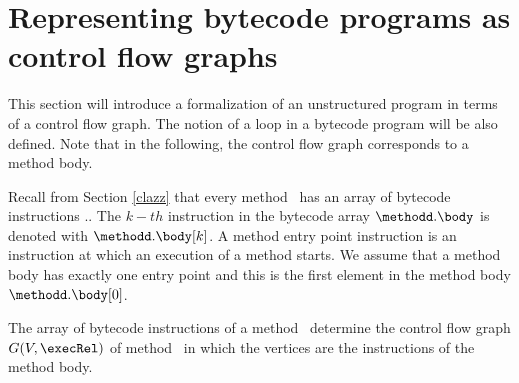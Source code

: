 \newtheorem{defEdge}{Definition}[section]
\newtheorem{defLoop}[defEdge]{Definition}
\newtheorem{defInter}[defEdge]{Definition}

\newtheorem{defInv}[defEdge]{Definition}
\newtheorem{defModif}[defEdge]{Definition}

\newtheorem{propPath}{Lemma}[section]

\section{Representing bytecode programs as control flow graphs}\label{prelim:ctrFlow}

This section will introduce a formalization of an unstructured program in terms of a control flow graph.
The notion of a loop in a bytecode program will be also defined. Note that in the following,
the control flow graph corresponds to a method body. 


Recall from Section \ref{clazz} that every method \methodd \ has an array of bytecode instructions \methodd.\body.
The $k-th$ instruction in the bytecode array $\methodd.\body$ is  denoted with $\methodd.\body[k]$. A method entry point instruction is 
 an instruction at which an execution of a method starts.
 We assume that a method body has exactly one entry point
 and this is the first element in the method body $\methodd.\body[0]$.

 The array of bytecode instructions of a method \methodd \ determine the control flow graph $G( V , \execRel ) $  of method \methodd \ 
in which the vertices are the instructions of the method body.



